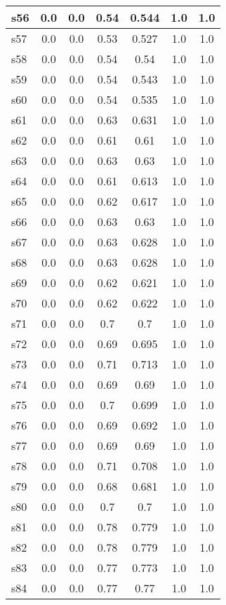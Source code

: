 \documentclass{article}
\begin{document}
\begin{tabular}{|l|c|c|c|c|c|c|}
\hline
s56 &0.0 & 0.0 & 0.54 & 0.544 & 1.0 & 1.0\\
\hline
s57 &0.0 & 0.0 & 0.53 & 0.527 & 1.0 & 1.0\\
\hline
s58 &0.0 & 0.0 & 0.54 & 0.54 & 1.0 & 1.0\\
\hline
s59 &0.0 & 0.0 & 0.54 & 0.543 & 1.0 & 1.0\\
\hline
s60 &0.0 & 0.0 & 0.54 & 0.535 & 1.0 & 1.0\\
\hline
s61 &0.0 & 0.0 & 0.63 & 0.631 & 1.0 & 1.0\\
\hline
s62 &0.0 & 0.0 & 0.61 & 0.61 & 1.0 & 1.0\\
\hline
s63 &0.0 & 0.0 & 0.63 & 0.63 & 1.0 & 1.0\\
\hline
s64 &0.0 & 0.0 & 0.61 & 0.613 & 1.0 & 1.0\\
\hline
s65 &0.0 & 0.0 & 0.62 & 0.617 & 1.0 & 1.0\\
\hline
s66 &0.0 & 0.0 & 0.63 & 0.63 & 1.0 & 1.0\\
\hline
s67 &0.0 & 0.0 & 0.63 & 0.628 & 1.0 & 1.0\\
\hline
s68 &0.0 & 0.0 & 0.63 & 0.628 & 1.0 & 1.0\\
\hline
s69 &0.0 & 0.0 & 0.62 & 0.621 & 1.0 & 1.0\\
\hline
s70 &0.0 & 0.0 & 0.62 & 0.622 & 1.0 & 1.0\\
\hline
s71 &0.0 & 0.0 & 0.7 & 0.7 & 1.0 & 1.0\\
\hline
s72 &0.0 & 0.0 & 0.69 & 0.695 & 1.0 & 1.0\\
\hline
s73 &0.0 & 0.0 & 0.71 & 0.713 & 1.0 & 1.0\\
\hline
s74 &0.0 & 0.0 & 0.69 & 0.69 & 1.0 & 1.0\\
\hline
s75 &0.0 & 0.0 & 0.7 & 0.699 & 1.0 & 1.0\\
\hline
s76 &0.0 & 0.0 & 0.69 & 0.692 & 1.0 & 1.0\\
\hline
s77 &0.0 & 0.0 & 0.69 & 0.69 & 1.0 & 1.0\\
\hline
s78 &0.0 & 0.0 & 0.71 & 0.708 & 1.0 & 1.0\\
\hline
s79 &0.0 & 0.0 & 0.68 & 0.681 & 1.0 & 1.0\\
\hline
s80 &0.0 & 0.0 & 0.7 & 0.7 & 1.0 & 1.0\\
\hline
s81 &0.0 & 0.0 & 0.78 & 0.779 & 1.0 & 1.0\\
\hline
s82 &0.0 & 0.0 & 0.78 & 0.779 & 1.0 & 1.0\\
\hline
s83 &0.0 & 0.0 & 0.77 & 0.773 & 1.0 & 1.0\\
\hline
s84 &0.0 & 0.0 & 0.77 & 0.77 & 1.0 & 1.0\\

\end{tabular}
\end{document}
